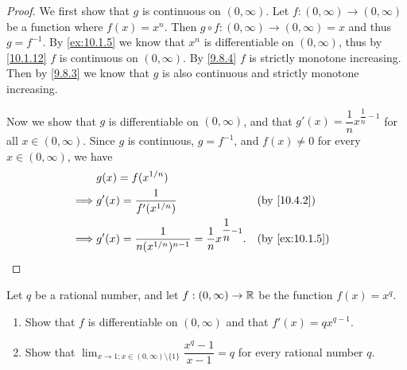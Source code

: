 \begin{proof}
  We first show that \(g\) is continuous on \((0, \infty)\).
  Let \(f : (0, \infty) \to (0, \infty)\) be a function where \(f(x) = x^n\).
  Then \(g \circ f : (0, \infty) \to (0, \infty) = x\) and thus \(g = f^{-1}\).
  By \cref{ex:10.1.5} we know that \(x^n\) is differentiable on \((0, \infty)\), thus by \cref{10.1.12} \(f\) is continuous on \((0, \infty)\).
  By \cref{9.8.4} \(f\) is strictly monotone increasing.
  Then by \cref{9.8.3} we know that \(g\) is also continuous and strictly monotone increasing.

  Now we show that \(g\) is differentiable on \((0, \infty)\), and that \(g'(x) = \dfrac{1}{n} x^{\dfrac{1}{n} - 1}\) for all \(x \in (0, \infty)\).
  Since \(g\) is continuous, \(g = f^{-1}\), and \(f(x) \neq 0\) for every \(x \in (0, \infty)\), we have
  \begin{align*}
             & g(x) = f(x^{1 / n})                                                                                             \\
    \implies & g'(x) = \dfrac{1}{f'(x^{1 / n})}                                              &  & \text{(by \cref{10.4.2})}    \\
    \implies & g'(x) = \dfrac{1}{n (x^{1 / n})^{n - 1}} = \dfrac{1}{n} x^{\dfrac{1}{n} - 1}. &  & \text{(by \cref{ex:10.1.5})}
  \end{align*}
\end{proof}

\begin{ex}\label{ex:10.4.2}
  Let \(q\) be a rational number, and let \(f : (0, \infty) \to \mathbb{R}\) be the function \(f(x) = x^q\).
  \begin{enumerate}
    \item Show that \(f\) is differentiable on \((0, \infty)\) and that \(f'(x) = q x^{q - 1}\).
    \item Show that \(\lim_{x \to 1 ; x \in (0, \infty) \setminus \{1\}} \dfrac{x^q - 1}{x - 1} = q\) for every rational number \(q\).
  \end{enumerate}
\end{ex}

